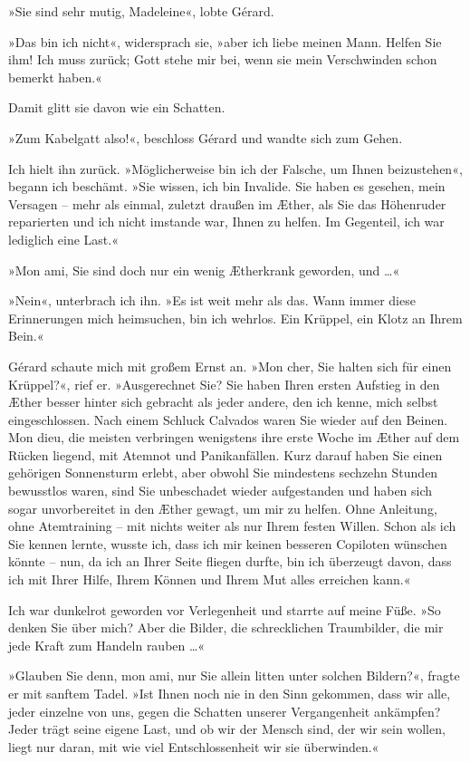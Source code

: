 »Sie sind sehr mutig, Madeleine«, lobte Gérard.

»Das bin ich nicht«, widersprach sie, »aber ich liebe meinen Mann.
Helfen Sie ihm! Ich muss zurück; Gott stehe mir bei, wenn sie mein
Verschwinden schon bemerkt haben.«

Damit glitt sie davon wie ein Schatten.

\bigpar

»Zum Kabelgatt also!«, beschloss Gérard und wandte sich zum Gehen.

Ich hielt ihn zurück. »Möglicherweise bin ich der Falsche, um Ihnen
beizustehen«, begann ich beschämt. »Sie wissen, ich bin Invalide.
Sie haben es gesehen, mein Versagen – mehr als einmal, zuletzt
draußen im Æther, als Sie das Höhenruder reparierten und ich nicht
imstande war, Ihnen zu helfen. Im Gegenteil, ich war lediglich eine
Last.«

»Mon ami, Sie sind doch nur ein wenig Ætherkrank geworden, und
\ldots{}«

»Nein«, unterbrach ich ihn. »Es ist weit mehr als das. Wann immer
diese Erinnerungen mich heimsuchen, bin ich wehrlos. Ein Krüppel,
ein Klotz an Ihrem Bein.«

Gérard schaute mich mit großem Ernst an. »Mon cher, Sie halten sich
für einen Krüppel?«, rief er. »Ausgerechnet Sie? Sie haben Ihren
ersten Aufstieg in den Æther besser hinter sich gebracht als jeder
andere, den ich kenne, mich selbst eingeschlossen. Nach einem
Schluck Calvados waren Sie wieder auf den Beinen. Mon dieu, die
meisten verbringen wenigstens ihre erste Woche im Æther auf dem
Rücken liegend, mit Atemnot und Panikanfällen. Kurz darauf haben
Sie einen gehörigen Sonnensturm erlebt, aber obwohl Sie mindestens
sechzehn Stunden bewusstlos waren, sind Sie unbeschadet wieder
aufgestanden und haben sich sogar unvorbereitet in den Æther
gewagt, um mir zu helfen. Ohne Anleitung, ohne Atemtraining – mit
nichts weiter als nur Ihrem festen Willen. Schon als ich Sie kennen
lernte, wusste ich, dass ich mir keinen besseren Copiloten wünschen
könnte – nun, da ich an Ihrer Seite fliegen durfte, bin ich
überzeugt davon, dass ich mit Ihrer Hilfe, Ihrem Können und Ihrem
Mut alles erreichen kann.«

Ich war dunkelrot geworden vor Verlegenheit und starrte auf meine
Füße. »So denken Sie über mich? Aber die Bilder, die schrecklichen
Traumbilder, die mir jede Kraft zum Handeln rauben \ldots{}«

»Glauben Sie denn, mon ami, nur Sie allein litten unter solchen
Bildern?«, fragte er mit sanftem Tadel. »Ist Ihnen noch nie in den
Sinn gekommen, dass wir alle, jeder einzelne von uns, gegen die
Schatten unserer Vergangenheit ankämpfen? Jeder trägt seine eigene
Last, und ob wir der Mensch sind, der wir sein wollen, liegt nur
daran, mit wie viel Entschlossenheit wir sie überwinden.«

